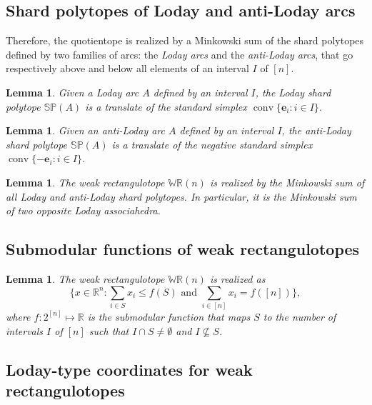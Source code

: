 \documentclass{amsart}
\newtheorem{lemma}[theorem]{Lemma}
\theoremstyle{definition}
\newcommand{\R}{\mathbb{R}} %
\DeclareMathOperator{\conv}{conv} %
\newcommand{\darkblue}{\color{darkblue}} %
\newcommand{\defn}[1]{\textsl{\darkblue #1}} %
\newcommand{\polytope}[1]{\mathds{#1}} %
\newcommand{\WRP}{\polytope{WR}} %
\newcommand{\SP}{\polytope{SP}}
\begin{document}

\subsection{Shard polytopes of Loday and anti-Loday arcs}

Therefore, the quotientope is realized by a Minkowski sum of the shard polytopes defined by two families of arcs: the \defn{Loday arcs} and the \defn{anti-Loday arcs}, that go respectively above and below all elements of an interval $I$ of $[n]$.

\begin{lemma}
  \label{lem:lodaysp}
  Given a Loday arc $A$ defined by an interval $I$, the Loday shard polytope $\SP(A)$ is a translate of the standard simplex $\conv \{ \mathbf{e}_i : i\in I \}$.
\end{lemma}

\begin{lemma}
  \label{lem:antilodaysp}
  Given an anti-Loday arc $A$ defined by an interval $I$, the anti-Loday shard polytope $\SP(A)$ is a translate of the negative standard simplex $\conv \{ - \mathbf{e}_i : i\in I \}$.
\end{lemma}

\begin{lemma}
  The weak rectangulotope $\WRP(n)$ is realized by the Minkowski sum of all Loday and anti-Loday shard polytopes. In particular, it is the Minkowski sum of two opposite Loday associahedra.
\end{lemma}

\subsection{Submodular functions of weak rectangulotopes}

\begin{lemma}
  The weak rectangulotope $\WRP(n)$ is realized as
  \[
  \{x\in\R^n : \sum_{i\in S} x_i \leq f(S) \text { and } \sum_{i\in [n]} x_i = f([n])\},
  \]
  where $f:2^{[n]}\mapsto \R$ is the submodular function that maps $S$ to the number of intervals
  $I$ of $[n]$ such that $I\cap S\not=\emptyset$ and $I\not\subseteq S$. 
\end{lemma}


\subsection{Loday-type coordinates for weak rectangulotopes}
\end{document}
